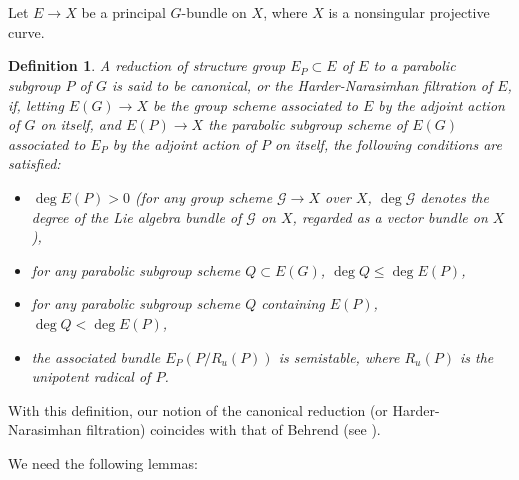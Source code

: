\documentclass[12pt]{article}
\newtheorem{definition}[proposition]{Definition}
\begin{document}
\section{}

Let $E \to X$ be a principal $G$-bundle on $X$, where $X$ is a nonsingular projective curve.

\begin{definition}\label{def:3.1}
A reduction of structure group $E_P \subset E$ of $E$ to a parabolic subgroup $P$ of $G$ is said to be canonical, or the Harder-Narasimhan filtration of $E$, if, letting $E(G) \to X$ be the group scheme associated to $E$ by the adjoint action of $G$ on itself, and $E(P) \to X$ the parabolic subgroup scheme of $E(G)$ associated to $E_P$ by the adjoint action of $P$ on itself, the following conditions are satisfied:
\begin{itemize}
    \item[(i)] $\deg E(P) > 0$ (for any group scheme $\mathcal{G} \to X$ over $X$, $\deg \mathcal{G}$ denotes the degree of the Lie algebra bundle of $\mathcal{G}$ on $X$, regarded as a vector bundle on $X$),
    \item[(ii)] for any parabolic subgroup scheme $Q \subset E(G)$, $\deg Q \leq \deg E(P)$,
    \item[(iii)] for any parabolic subgroup scheme $Q$ containing $E(P)$, $\deg Q < \deg E(P)$,
    \item[(iv)] the associated bundle $E_P(P/R_u(P))$ is semistable, where $R_u(P)$ is the unipotent radical of $P$.
\end{itemize}
\end{definition}

With this definition, our notion of the canonical reduction (or Harder-Narasimhan filtration) coincides with that of Behrend (see \cite[definition 5.6, and the proof of Proposition 7.2]{behrend}).

We need the following lemmas:
\end{document}
